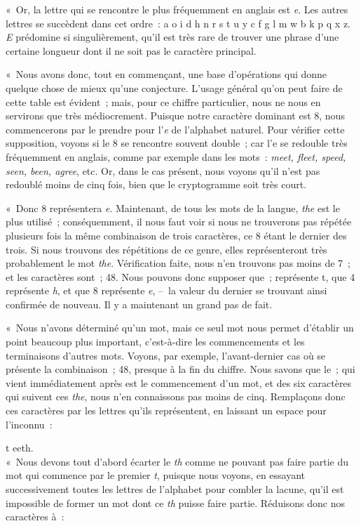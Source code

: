 \documentclass[french,twoside]{book} %
\begin{document}
\noindent « Or, la lettre qui se rencontre le plus fréquemment en anglais est \emph{e}. Les autres lettres se succèdent dans cet ordre : a o i d h n r s t u y c f g l m w b k p q x z. \emph{E} prédomine si singulièrement, qu’il est très rare de trouver une phrase d’une certaine longueur dont il ne soit pas le caractère principal.\par
« Nous avons donc, tout en commençant, une base d’opérations qui donne quelque chose de mieux qu’une conjecture. L’usage général qu’on peut faire de cette table est évident ; mais, pour ce chiffre particulier, nous ne nous en servirons que très médiocrement. Puisque notre caractère dominant est 8, nous commencerons par le prendre pour l’\emph{e} de l’alphabet naturel. Pour vérifier cette supposition, voyons si le 8 se rencontre souvent double ; car l’e se redouble très fréquemment en anglais, comme par exemple dans les mots : \emph{meet, fleet, speed, seen, been, agree}, etc. Or, dans le cas présent, nous voyons qu’il n’est pas redoublé moins de cinq fois, bien que le cryptogramme soit très court.\par
« Donc 8 représentera \emph{e}. Maintenant, de tous les mots de la langue, \emph{the} est le plus utilisé ; conséquemment, il nous faut voir si nous ne trouverons pas répétée plusieurs fois la même combinaison de trois caractères, ce 8 étant le dernier des trois. Si nous trouvons des répétitions de ce genre, elles représenteront très probablement le mot\emph{ the}. Vérification faite, nous n’en trouvons pas moins de 7 ; et les caractères sont ; 48. Nous pouvons donc supposer que ; représente t, que 4 représente \emph{h}, et que 8 représente \emph{e}, – la valeur du dernier se trouvant ainsi confirmée de nouveau. Il y a maintenant un grand pas de fait.\par
« Nous n’avons déterminé qu’un mot, mais ce seul mot nous permet d’établir un point beaucoup plus important, c’est-à-dire les commencements et les terminaisons d’autres mots. Voyons, par exemple, l’avant-dernier cas où se présente la combinaison ; 48, presque à la fin du chiffre. Nous savons que le ; qui vient immédiatement après est le commencement d’un mot, et des six caractères qui suivent ces \emph{the}, nous n’en connaissons pas moins de cinq. Remplaçons donc ces caractères par les lettres qu’ils représentent, en laissant un espace pour l’inconnu :\par

t eeth.\\

\noindent « Nous devons tout d’abord écarter le \emph{th} comme ne pouvant pas faire partie du mot qui commence par le premier \emph{t}, puisque nous voyons, en essayant successivement toutes les lettres de l’alphabet pour combler la lacune, qu’il est impossible de former un mot dont ce\emph{ th} puisse faire partie. Réduisons donc nos caractères à :\par
\end{document}
